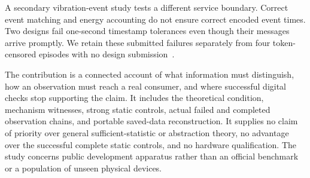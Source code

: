A secondary vibration-event study tests a different service boundary. Correct
event matching and energy accounting do not ensure correct encoded event
times. Two designs fail one-second timestamp tolerances even though their
messages arrive promptly. We retain these submitted failures separately from
four token-censored episodes with no design submission~\cite{final}.

The contribution is a connected account of what information must distinguish,
how an observation must reach a real consumer, and where successful digital
checks stop supporting the claim. It includes the theoretical condition,
mechanism witnesses, strong static controls, actual failed and completed
observation chains, and portable saved-data reconstruction. It supplies no
claim of priority over general sufficient-statistic or abstraction theory,
no advantage over the successful complete static controls, and no hardware
qualification. The study concerns public development apparatus rather than
an official benchmark or a population of unseen physical devices.
